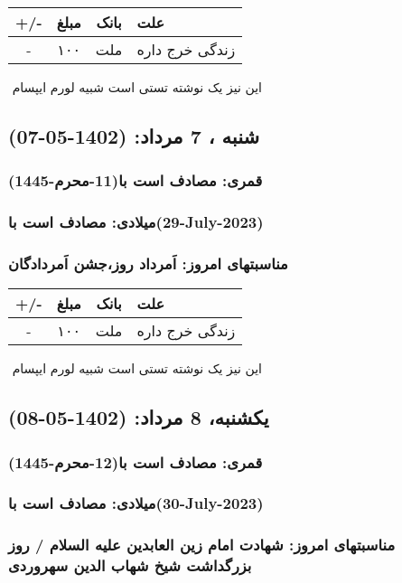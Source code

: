 \documentclass{article}
\newcommand{\rnote}[1]{\marginpar{\textcolor{color}{\StrSubstitute{\##1}{ }{\_}}}}
\newcommand{\myRow}[4]{
    #1 & #2 & #3 & #4 \\ \hline
}
\begin{document}
\begin{tabular}{ | c | c | c | p{5cm} |}
    \hline
    \myRow{ +/- }{مبلغ}{بانک}{علت}
    \myRow{-}{۱۰۰}{ملت}{زندگی خرج داره}
\end{tabular}
\newline
\newline

‌
\rnote{تست}
این نیز یک نوشته تستی است شبیه لورم ایپسام




\newpage
{}
\textcolor{color}{
\section{ شنبه ، 7 مرداد: (1402-05-07) }
\subsubsection*{قمری: مصادف است با(11-محرم-1445)} 
\subsubsection*{میلادی: مصادف است با(29-July-2023)}
\subsubsection*{مناسبتهای امروز: اَمرداد روز،جشن اَمردادگان}
}


\begin{tabular}{ | c | c | c | p{5cm} |}
    \hline
    \myRow{ +/- }{مبلغ}{بانک}{علت}
    \myRow{-}{۱۰۰}{ملت}{زندگی خرج داره}
\end{tabular}
\newline
\newline

‌
\rnote{تست}
این نیز یک نوشته تستی است شبیه لورم ایپسام




\newpage
{}
\textcolor{color}{
\section{ یکشنبه، 8 مرداد: (1402-05-08) }
\subsubsection*{قمری: مصادف است با(12-محرم-1445)} 
\subsubsection*{میلادی: مصادف است با(30-July-2023)}
\subsubsection*{مناسبتهای امروز: شهادت امام زین العابدین علیه السلام / روز بزرگداشت شیخ شهاب الدین سهروردی}
}
\end{document}
